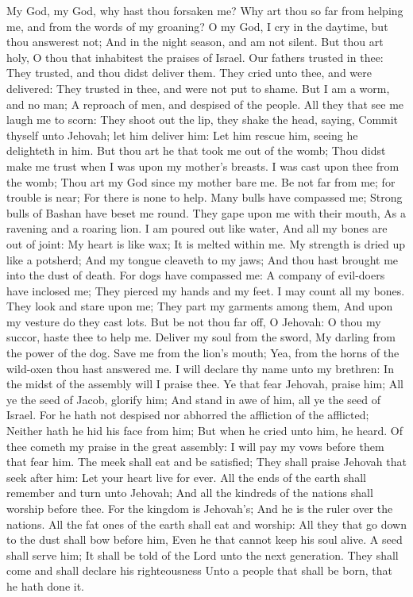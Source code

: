 My God, my God, why hast thou forsaken me? Why art thou so far from helping me, and from the words of my groaning?  O my God, I cry in the daytime, but thou answerest not; And in the night season, and am not silent.  But thou art holy, O thou that inhabitest the praises of Israel.  Our fathers trusted in thee: They trusted, and thou didst deliver them.  They cried unto thee, and were delivered: They trusted in thee, and were not put to shame.  But I am a worm, and no man; A reproach of men, and despised of the people.  All they that see me laugh me to scorn: They shoot out the lip, they shake the head, saying,  Commit thyself unto Jehovah; let him deliver him: Let him rescue him, seeing he delighteth in him.  But thou art he that took me out of the womb; Thou didst make me trust when I was upon my mother’s breasts.  I was cast upon thee from the womb; Thou art my God since my mother bare me.  Be not far from me; for trouble is near; For there is none to help.  Many bulls have compassed me; Strong bulls of Bashan have beset me round.  They gape upon me with their mouth, As a ravening and a roaring lion.  I am poured out like water, And all my bones are out of joint: My heart is like wax; It is melted within me.  My strength is dried up like a potsherd; And my tongue cleaveth to my jaws; And thou hast brought me into the dust of death.  For dogs have compassed me: A company of evil-doers have inclosed me; They pierced my hands and my feet.  I may count all my bones. They look and stare upon me;  They part my garments among them, And upon my vesture do they cast lots.  But be not thou far off, O Jehovah: O thou my succor, haste thee to help me.  Deliver my soul from the sword, My darling from the power of the dog.  Save me from the lion’s mouth; Yea, from the horns of the wild-oxen thou hast answered me.  I will declare thy name unto my brethren: In the midst of the assembly will I praise thee.  Ye that fear Jehovah, praise him; All ye the seed of Jacob, glorify him; And stand in awe of him, all ye the seed of Israel.  For he hath not despised nor abhorred the affliction of the afflicted; Neither hath he hid his face from him; But when he cried unto him, he heard.  Of thee cometh my praise in the great assembly: I will pay my vows before them that fear him.  The meek shall eat and be satisfied; They shall praise Jehovah that seek after him: Let your heart live for ever.  All the ends of the earth shall remember and turn unto Jehovah; And all the kindreds of the nations shall worship before thee.  For the kingdom is Jehovah’s; And he is the ruler over the nations.  All the fat ones of the earth shall eat and worship: All they that go down to the dust shall bow before him, Even he that cannot keep his soul alive.  A seed shall serve him; It shall be told of the Lord unto the next generation.  They shall come and shall declare his righteousness Unto a people that shall be born, that he hath done it. 

